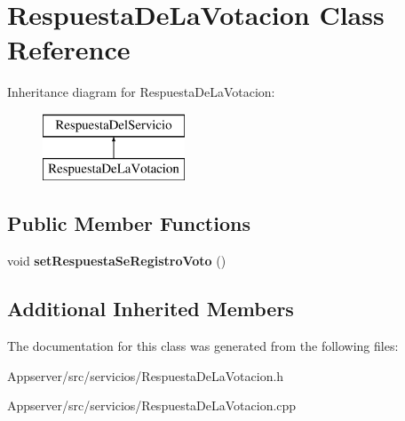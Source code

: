 \hypertarget{classRespuestaDeLaVotacion}{}\section{Respuesta\+De\+La\+Votacion Class Reference}
\label{classRespuestaDeLaVotacion}
Inheritance diagram for Respuesta\+De\+La\+Votacion\+:\begin{figure}[H]
\begin{center}
\leavevmode
\includegraphics[height=2.000000cm]{classRespuestaDeLaVotacion}
\end{center}
\end{figure}
\subsection*{Public Member Functions}
\begin{DoxyCompactItemize}
\item 
void {\bfseries set\+Respuesta\+Se\+Registro\+Voto} ()\hypertarget{classRespuestaDeLaVotacion_aed9b86c5d70e506716961f6bc5f4cc80}{}\label{classRespuestaDeLaVotacion_aed9b86c5d70e506716961f6bc5f4cc80}

\end{DoxyCompactItemize}
\subsection*{Additional Inherited Members}


The documentation for this class was generated from the following files\+:\begin{DoxyCompactItemize}
\item 
Appserver/src/servicios/Respuesta\+De\+La\+Votacion.\+h\item 
Appserver/src/servicios/Respuesta\+De\+La\+Votacion.\+cpp\end{DoxyCompactItemize}
